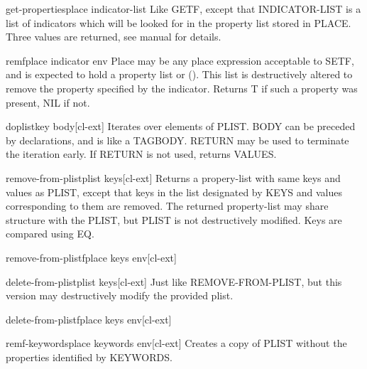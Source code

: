 \documentclass[10pt,english]{book}
\begin{document}
\begin{function}{get-properties}{place indicator-list}
  Like GETF, except that INDICATOR-LIST is a list of indicators which will
  be looked for in the property list stored in PLACE. Three values are
  returned, see manual for details.
\end{function}

\begin{macro}{remf}{place indicator \env env}
  Place may be any place expression acceptable to SETF, and is expected
  to hold a property list or (). This list is destructively altered to
  remove the property specified by the indicator. Returns T if such a
  property was present, NIL if not.
\end{macro}

\begin{macro}{doplist}{key \body body}[cl-ext]
  Iterates over elements of PLIST. BODY can be preceded by
declarations, and is like a TAGBODY. RETURN may be used to terminate
the iteration early. If RETURN is not used, returns VALUES.
\end{macro}

\begin{function}{remove-from-plist}{plist \rest keys}[cl-ext]
  Returns a propery-list with same keys and values as PLIST, except that keys
in the list designated by KEYS and values corresponding to them are removed.
The returned property-list may share structure with the PLIST, but PLIST is
not destructively modified. Keys are compared using EQ.
\end{function}

\begin{macro}{remove-from-plistf}{place \rest keys \env env}[cl-ext]
  
\end{macro}

\begin{function}{delete-from-plist}{plist \rest keys}[cl-ext]
  Just like REMOVE-FROM-PLIST, but this version may destructively modify the
provided plist.
\end{function}

\begin{macro}{delete-from-plistf}{place \rest keys \env env}[cl-ext]
  
\end{macro}

\begin{macro}{remf-keywords}{place \rest keywords \env env}[cl-ext]
  Creates a copy of PLIST without the properties identified by KEYWORDS.
\end{macro}
\end{document}
